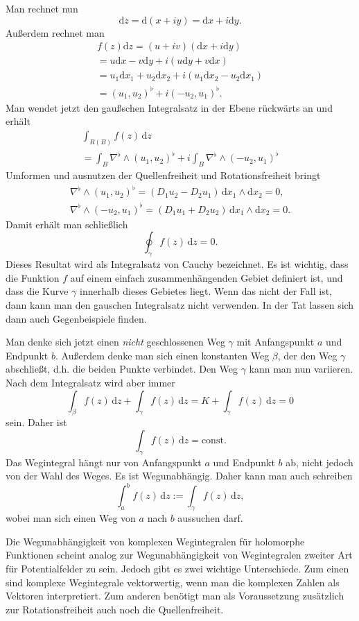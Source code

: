 \documentclass[a4paper,10pt,fleqn,twocolumn,twoside]{article}
\begin{document}
Man rechnet nun
\[\mathrm dz = \mathrm d(x+iy) = \mathrm dx+i\mathrm dy.\]
Außerdem rechnet man
\begin{gather*}
f(z)\mathrm dz = (u+iv)(\mathrm dx+i\mathrm dy)\\
= u\mathrm dx-v\mathrm dy+i(u\mathrm dy+v\mathrm dx)\\
= u_1\mathrm dx_1+u_2\mathrm dx_2+i(u_1\mathrm dx_2-u_2\mathrm dx_1)\\
= (u_1,u_2)^\flat + i(-u_2,u_1)^\flat.
\end{gather*}
Man wendet jetzt den gaußschen Integralsatz in der Ebene rückwärts an
und erhält
\begin{gather*}
\int_{R(B)} f(z)\,\mathrm dz\\
= \int_B \nabla^\flat\wedge (u_1,u_2)^\flat
+ i\int_B \nabla^\flat\wedge (-u_2,u_1)^\flat
\end{gather*}
Umformen und ausnutzen der Quellenfreiheit
und Rotationsfreiheit bringt
\begin{gather*}
\nabla^\flat\wedge (u_1,u_2)^\flat
= (D_1u_2-D_2u_1)\,\mathrm dx_1\wedge\mathrm dx_2= 0,\\
\nabla^\flat\wedge (-u_2,u_1)^\flat = (D_1u_1+D_2u_2)\,
\mathrm dx_1\wedge\mathrm dx_2 = 0.
\end{gather*}
Damit erhält man schließlich
\[\oint_\gamma f(z)\,\mathrm dz = 0.\]
Dieses Resultat wird als Integralsatz von Cauchy bezeichnet.
Es ist wichtig, dass die Funktion \(f\) auf einem einfach
zusammenhängenden Gebiet definiert ist, und dass die Kurve \(\gamma\)
innerhalb dieses Gebietes liegt. Wenn das nicht der Fall ist, dann
kann man den gauschen Integralsatz nicht verwenden. In der Tat lassen
sich dann auch Gegenbeispiele finden.

Man denke sich jetzt einen \textit{nicht} geschlossenen Weg \(\gamma\)
mit Anfangspunkt \(a\) und Endpunkt \(b\). Außerdem denke man sich
einen konstanten Weg \(\beta\), der den Weg \(\gamma\)
abschließt, d.h. die beiden Punkte verbindet. Den Weg \(\gamma\)
kann man nun variieren. Nach dem Integralsatz wird aber immer
\[\int_{\beta} f(z)\,\mathrm dz+\int_\gamma f(z)\,\mathrm dz
=K+\int_\gamma f(z)\,\mathrm dz=0\]
sein. Daher ist
\[\int_\gamma f(z)\,\mathrm dz=\mathrm{const}.\]
Das Wegintegral hängt nur von Anfangspunkt \(a\) und Endpunkt \(b\)
ab, nicht jedoch von der Wahl des Weges. Es ist Wegunabhängig. Daher
kann man auch schreiben
\[\int_a^b f(z)\,\mathrm dz:=\int_\gamma f(z)\,\mathrm dz,\]
wobei man sich einen Weg von \(a\) nach \(b\) aussuchen darf.

Die Wegunabhängigkeit von komplexen Wegintegralen für holomorphe
Funktionen scheint analog zur Wegunabhängigkeit von Wegintegralen
zweiter Art für Potentialfelder zu sein. Jedoch gibt es zwei wichtige
Unterschiede. Zum einen sind komplexe Wegintegrale vektorwertig, wenn
man die komplexen Zahlen als Vektoren interpretiert. Zum anderen
benötigt man als Voraussetzung zusätzlich zur Rotationsfreiheit
auch noch die Quellenfreiheit.
\end{document}
